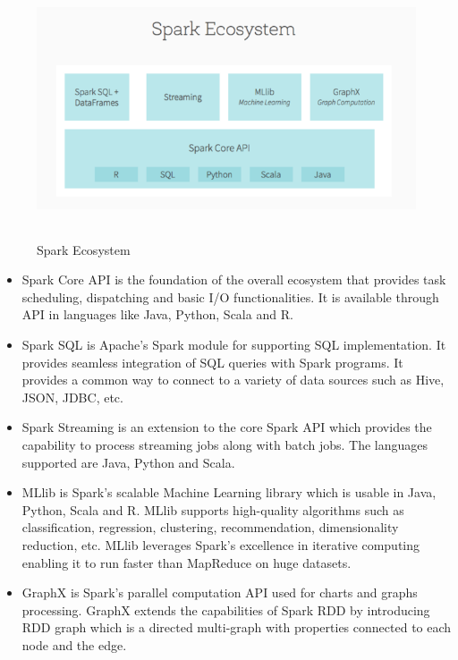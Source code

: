 \documentclass[sigconf]{acmart}
\begin{document}
\begin{figure}
\includegraphics[height=3in, width=5in]{images/spark-ecosystem}
\caption{Spark Ecosystem\cite{img-echo}}
\label{Figure 2}
\end{figure}

\begin{itemize}

	\item Spark Core API is the foundation of the overall ecosystem that provides task scheduling, dispatching and basic I/O functionalities. It is available through API in languages like Java, Python, Scala and R.

  \item Spark SQL is Apache's Spark module for supporting SQL implementation. It provides seamless integration of SQL queries with Spark programs. It provides a common way to connect to a variety of data sources such as Hive, JSON, JDBC, etc.
  
  \item Spark Streaming is an extension to the core Spark API which provides the capability to process streaming jobs along with batch jobs. The languages supported are Java, Python and Scala.

  \item MLlib is Spark's scalable Machine Learning library which is usable in Java, Python, Scala and R. MLlib supports high-quality algorithms such as classification, regression, clustering, recommendation, dimensionality reduction, etc. MLlib leverages Spark's excellence in iterative computing enabling it to run faster than MapReduce on huge datasets.

  \item GraphX is Spark's parallel computation API used for charts and graphs processing\cite{fu2016spark-p1}. GraphX extends the capabilities of Spark RDD by introducing RDD graph which is a directed multi-graph with properties connected to each node and the edge\cite{spark-a1}. 
  
\end{itemize}
\end{document}
